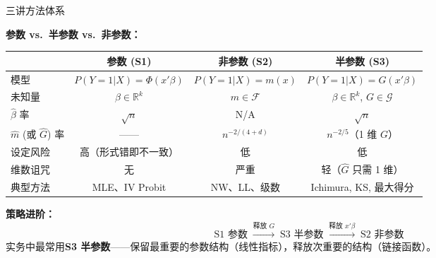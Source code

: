 \documentclass[aspectratio=169, 10pt]{beamer}
\renewcommand{\arraystretch}{1.05}
\begin{document}
\begin{frame}{三讲方法体系}

  \begin{highlightbox}
    \textbf{参数 vs.\ 半参数 vs.\ 非参数：}
  \end{highlightbox}

  \centering\small
  \renewcommand{\arraystretch}{1.35}
  \begin{tabular}{@{}lccc@{}}
    \toprule
     & \textbf{参数 (S1)} & \textbf{非参数 (S2)} & \textbf{半参数 (S3)} \\
    \midrule
    模型 & $P(Y=1|X)=\Phi(x'\beta)$ & $P(Y=1|X)=m(x)$ & $P(Y=1|X)=G(x'\beta)$ \\
    未知量 & $\beta\in\mathbb{R}^k$ & $m\in\mathcal{F}$ & $\beta\in\mathbb{R}^k$, $G\in\mathcal{G}$ \\
    $\hat\beta$ 率 & $\sqrt{n}$ & N/A & $\sqrt{n}$ \\
    $\hat m$ (或 $\hat G$) 率 & —— & $n^{-2/(4+d)}$ & $n^{-2/5}$（1 维 $G$）\\
    设定风险 & 高（形式错即不一致） & 低 & 低 \\
    维数诅咒 & 无 & 严重 & 轻（$\hat G$ 只需 1 维） \\
    典型方法 & MLE、IV Probit & NW、LL、级数 & Ichimura, KS, 最大得分 \\
    \bottomrule
  \end{tabular}


  \begin{keybox}
    \textbf{策略进阶：}
    \[
      \text{S1 参数}\;\xrightarrow{\text{释放 }G}\;\text{S3 半参数}\;\xrightarrow{\text{释放 }x'\beta}\;\text{S2 非参数}
    \]
    实务中最常用\textbf{S3 半参数}——保留最重要的参数结构（线性指标），释放次重要的结构（链接函数）。
  \end{keybox}

\end{frame}
\end{document}

